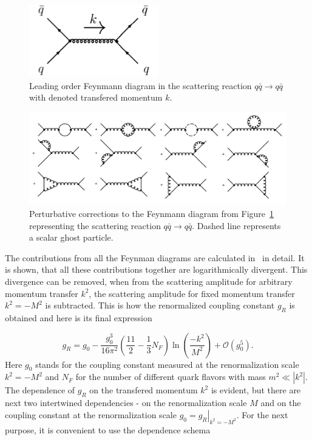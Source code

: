 \begin{figure}[t]
  \centering
  \includegraphics[width=0.5\textwidth]{Chapter1/QuarkQuarkScattering.png} 
  \caption{Leading order Feynmann diagram in the scattering reaction $q \bar{q}
    \rightarrow q \bar{q}$ with denoted transfered momentum $k$.}
  \label{fig:QuarkQuarkScattering}
\end{figure}

\begin{figure}[t]
  \centering
  \includegraphics[width=\textwidth]{Chapter1/QuarkQuarkCorrection.png} 
  \caption{Perturbative corrections to the Feynmann diagram from
    Figure~\ref{fig:QuarkQuarkScattering} representing the scattering reaction
    $q \bar{q} \rightarrow q \bar{q}$. Dashed line represents a scalar ghost
    particle.}
  \label{fig:QuarkQuarkScatteringCorrection}
\end{figure}

The contributions from all the Feynman diagrams are calculated in~\cite{QCDTextbook}
in detail. It is shown, that all these contributions together are
logarithmically divergent. This divergence can be removed, when from the scattering
amplitude for arbitrary momentum transfer $k^2$, the scattering amplitude for fixed
momentum transfer $k^2 = -M^2$ is subtracted. This is how the renormalized
coupling constant $g_R$ is obtained and here is its final expression 

\begin{equation}
  g_R = g_0 - \frac{g_0^3}{16\pi^2} \left( \frac{11}{2} - \frac{1}{3}N_F \right)
  \ln \left( \frac{-k^2}{M^2} \right) + \mathscr{O}(g_0^5).
  \label{eq:RenormalizedCoupling}
\end{equation}
Here $g_0$ stands for the coupling constant measured at the renormalization scale
$k^2 = -M^2$ and $N_F$ for the number of different quark flavors with mass $m^2
\ll \left| k^2 \right|$. The dependence of $g_R$ on the transfered momentum $k^2$ is
evident, but there are next two intertwined dependencies - on the renormalization
scale $M$ and on the coupling constant at the renormalization scale $g_0 =
\left. g_R \right|_{k^2=-M^2}$. For the next purpose, it is convenient to use the
dependence schema


